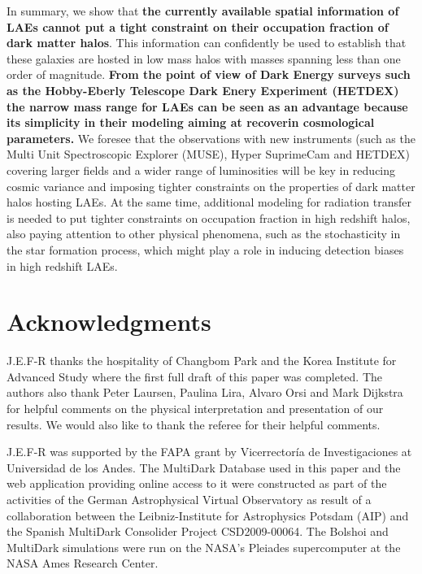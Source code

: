 \documentclass[usenatbib]{mn2e}
\newcommand{\ly}{{\ifmmode{{\rm Ly}\alpha}\else{Ly$\alpha$~}\fi}}
\begin{document}
In summary, we show that {\bf the currently available spatial
  information of LAEs cannot put a tight constraint on their
  occupation fraction of dark matter halos}. This information can
confidently be used to establish that these galaxies are hosted in low
mass halos with masses spanning less than one order of magnitude. {\bf
  From the point of view of Dark Energy surveys such as the Hobby-Eberly
  Telescope Dark Enery Experiment (HETDEX) the
  narrow mass range for LAEs can be seen as an advantage because its
  simplicity in their modeling aiming at recoverin cosmological
  parameters.} We foresee that the observations with new instruments
(such as the Multi Unit Spectroscopic Explorer (MUSE), Hyper
SuprimeCam and HETDEX) covering larger fields and a wider range of
luminosities will be key in reducing cosmic variance and imposing
tighter constraints on the properties of dark matter halos hosting
LAEs. At the same time, additional modeling for \ly radiation transfer
is needed to put tighter constraints on  occupation fraction in high
redshift halos, also paying attention to other physical phenomena,
such as the stochasticity \citep{ForeroRomero2013} in the star
formation process, which might play a role in inducing detection
biases in high redshift LAEs.  


\section*{Acknowledgments} 
J.E.F-R thanks the hospitality of Changbom Park and the Korea
Institute for Advanced Study where the first full draft of this paper
was completed. The authors also thank Peter Laursen, Paulina Lira, 
Alvaro Orsi and Mark Dijkstra for helpful comments on the physical
interpretation and presentation of our results. We would
also like to thank the referee for their helpful comments.

J.E.F-R was
supported by the FAPA grant by Vicerrector\'ia de Investigaciones at
Universidad de los Andes. The MultiDark Database used in this paper and the web application providing online access to it were constructed as part of the
activities of the German Astrophysical Virtual Observatory as result
of a collaboration between the Leibniz-Institute for Astrophysics
Potsdam (AIP) and the Spanish MultiDark Consolider Project
CSD2009-00064. The Bolshoi and MultiDark simulations were run on the
NASA's Pleiades supercomputer at the NASA Ames Research Center.




 
\end{document}
